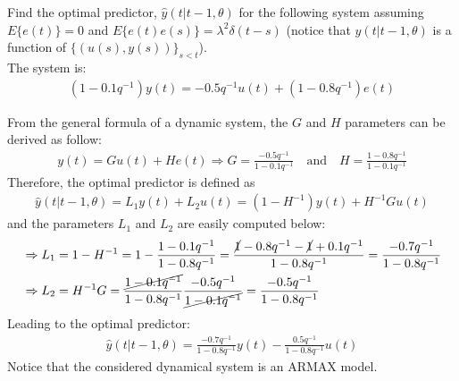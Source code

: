 \Exercise[number={3}]
Find the optimal predictor, \(\hat{y}(t|t-1,\theta)\) for the following
system assuming \(E\{e(t)\}=0\) and \(E\{e(t)e(s)\}=\lambda^2\delta(t-s)\)
(notice that \(y(t|t-1,\theta)\) is a function of \(\{(u(s),y(s))\}_{s<t}\)).\\
The system is:
\begin{align*}
    (1-0.1q^{-1})y(t)=-0.5q^{-1}u(t)+(1-0.8q^{-1})e(t)
\end{align*}

\Answer[number={3}]
From the general formula of a dynamic system, the \(G\) and \(H\)
parameters can be derived as follow:
\begin{align*}
    y(t)=Gu(t)+He(t)
    \Rightarrow
    G=\frac{-0.5q^{-1}}{1-0.1q^{-1}} \quad\text{and}\quad H=\frac{1-0.8q^{-1}}{1-0.1q^{-1}}
\end{align*}
Therefore, the optimal predictor is defined as
\begin{align*}
    \hat{y}(t|t-1,\theta) = L_1y(t)+L_2u(t) = (1-H^{-1})y(t)+H^{-1}Gu(t)
\end{align*}
and the parameters \(L_1\) and \(L_2\) are easily computed below:
\begin{align*}
    &\Rightarrow
    L_1 = 1-H^{-1} = 1-\frac{1-0.1q^{-1}}{1-0.8q^{-1}} = \frac{\cancel{1}-0.8q^{-1}-\cancel{1}+0.1q^{-1}}{1-0.8q^{-1}}=\frac{-0.7q^{-1}}{1-0.8q^{-1}}\\
    &\Rightarrow
    L_2 = H^{-1}G = \frac{\cancel{1-0.1q^{-1}}}{1-0.8q^{-1}}\frac{-0.5q^{-1}}{\cancel{1-0.1q^{-1}}}=\frac{-0.5q^{-1}}{1-0.8q^{-1}}
\end{align*}
Leading to the optimal predictor:
\begin{align*}
    \hat{y}(t|t-1,\theta) = \frac{-0.7q^{-1}}{1-0.8q^{-1}}y(t)-\frac{0.5q^{-1}}{1-0.8q^{-1}}u(t)
\end{align*}
Notice that the considered dynamical system is an ARMAX model.